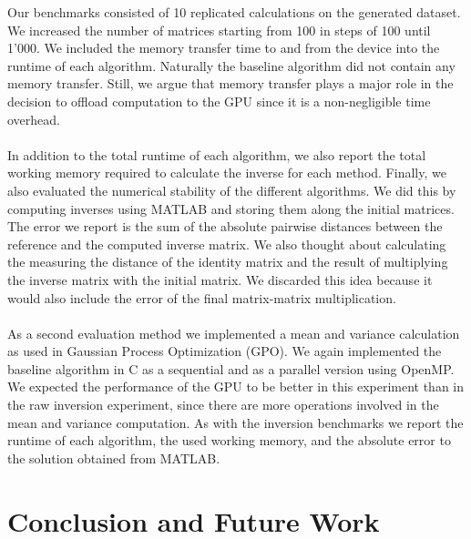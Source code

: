 \documentclass[11pt]{article}
\begin{document}
Our benchmarks consisted of 10 replicated calculations on the generated dataset. We increased the number of matrices starting from 100 in steps of 100 until 1’000. We included the memory transfer time to and from the device into the runtime of each algorithm. Naturally the baseline algorithm did not contain any memory transfer. Still, we argue that memory transfer plays a major role in the decision to offload computation to the GPU since it is a non-negligible time overhead.\\\\
In addition to the total runtime of each algorithm, we also report the total working memory required to calculate the inverse for each method. Finally, we also evaluated the numerical stability of the different algorithms. We did this by computing inverses using MATLAB and storing them along the initial matrices. The error we report is the sum of the absolute pairwise distances between the reference and the computed inverse matrix. We also thought about calculating the measuring the distance of the identity matrix and the result of multiplying the inverse matrix with the initial matrix. We discarded this idea because it would also include the error of the final matrix-matrix multiplication.\\\\
As a second evaluation method we implemented a mean and variance calculation as used in Gaussian Process Optimization (GPO). We again implemented the baseline algorithm in C as a sequential and as a parallel version using OpenMP. We expected the performance of the GPU to be better in this experiment than in the raw inversion experiment, since there are more operations involved in the mean and variance computation. As with the inversion benchmarks we report the runtime of each algorithm, the used working memory, and the absolute error to the solution obtained from MATLAB.

\section{Conclusion and Future Work}

\newpage



\end{document}
